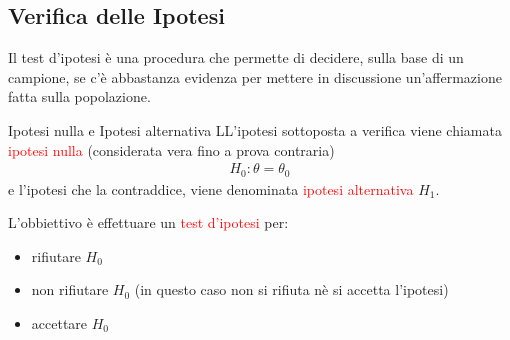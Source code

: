 \documentclass{article}  %
\theoremstyle{definition}
\begin{document}
\subsection{Verifica delle Ipotesi}
Il test d'ipotesi è una procedura che permette di decidere, sulla base di un campione, se c'è abbastanza evidenza per mettere in discussione un'affermazione fatta sulla popolazione.
\begin{theorem}{Ipotesi nulla e Ipotesi alternativa}
	LL'ipotesi sottoposta a verifica viene chiamata \textcolor{red}{ipotesi nulla} (considerata vera fino a prova contraria)
	\begin{align*}
		H_0: \theta = \theta_0
	\end{align*}
	e l'ipotesi che la contraddice, viene denominata \textcolor{red}{ipotesi alternativa} $H_1$.
\end{theorem}
\begin{osservazioni}[Obbiettivo]
	L'obbiettivo è effettuare un \textcolor{red}{test d'ipotesi} per:
	\begin{itemize}
		\item rifiutare $H_0$
		\item non rifiutare $H_0$ (in questo caso non si rifiuta nè si accetta l'ipotesi)
		\item accettare $H_0$
	\end{itemize}
\end{osservazioni}
\end{document}
